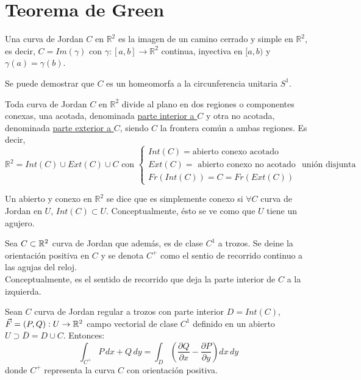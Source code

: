 \section{Teorema de Green}
\begin{definición}
    Una curva de Jordan $C$ en $\mathbb{R}^2$ es la imagen de un camino cerrado y simple en $\mathbb{R}^2$, es decir, $C = Im(\gamma)$ con $\gamma: [a,b] \to \mathbb{R}^2$ continua, inyectiva en $[a, b)$ y $\gamma(a) = \gamma(b)$.
    \end{definición}
    \begin{observación}
    Se puede demostrar que $C$ es un homeomorfa a la circunferencia unitaria $S^1$.
    \end{observación}
    \begin{teorema}
        Toda curva de Jordan $C$ en $\mathbb{R}^2$ divide al plano en dos regiones  o componentes conexas, una acotada, denominada \underline{parte interior a $C$} y otra no acotada, denominada \underline{parte exterior a $C$}, siendo $C$ la frontera común a ambas regiones. Es decir,
        $$\mathbb{R}^2 = Int(C) \cup Ext(C) \cup C \text{ con } \begin{cases}
                Int(C) = \text{abierto conexo acotado} \\ Ext(C) = \text{ abierto conexo no acotado} \\ Fr(Int(C)) = C = Fr(Ext(C))
            \end{cases} \text{ unión disjunta}$$
    \end{teorema}
    \begin{definición}
    Un abierto y conexo en $\mathbb{R}^2$ se dice que es simplemente conexo si $\forall C$ curva de Jordan en $U$, $Int(C) \subset U$. Conceptualmente, ésto se ve como que $U$ tiene un agujero.
    \end{definición}
    
    \begin{definición}
    Sea $C \subset \mathbb{R}^2$ curva de Jordan que además, es de clase $C^1$ a trozos. Se deine la orientación positiva en $C$ y se denota $C^+$ como el sentio de recorrido continuo a las agujas del reloj. \\
    Conceptualmente, es el sentido de recorrido que deja la parte interior de $C$ a la izquierda.
    \end{definición}
    
    \begin{teorema}
        Sean $C$ curva de Jordan regular a trozos con parte interior $D = Int(C)$, $\vec{F} = (P, Q) : U \to \mathbb{R}^2$ campo vectorial de clase $C^1$ definido en un abierto $U \supset \overline{D} = D \cup C$. Entonces:
        $$\int_{C^+} P \, dx + Q \, dy = \int_{D} \left(\frac{\partial Q}{\partial x} - \frac{\partial P}{\partial y}\right) dx \, dy
        $$
        donde $C^+$ representa la curva $C$ con orientación positiva.
    \end{teorema}
    
